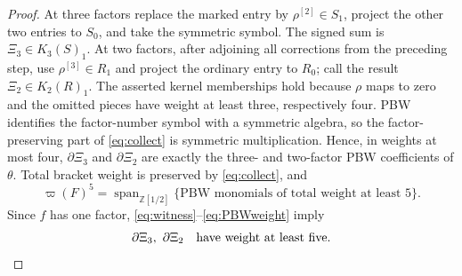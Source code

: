 \documentclass[10pt,a4paper]{amsart}
\theoremstyle{remark}
\newcommand{\R}{\mathbb Z[1/2]}
\newcommand{\aug}{\varpi}
\begin{document}
\begin{proof}
At three factors replace the marked entry by
$\rho^{[2]}\in S_1$, project the other two entries to $S_0$, and take
the symmetric symbol.  The signed sum is
$\Xi_3\in K_3(S)_1$.  At two factors, after adjoining all corrections
from the preceding step, use $\rho^{[3]}\in R_1$ and project the
ordinary entry to $R_0$; call the result
$\Xi_2\in K_2(R)_1$.  The asserted kernel memberships hold because
$\rho$ maps to zero and the omitted pieces have weight at least three,
respectively four.  PBW identifies the factor-number symbol with a
symmetric algebra, so the factor-preserving part of
\eqref{eq:collect} is symmetric multiplication.  Hence, in weights at
most four, $\partial\Xi_3$ and $\partial\Xi_2$ are exactly the three-
and two-factor PBW coefficients of $\theta$.
Total bracket weight is preserved by \eqref{eq:collect}, and
\begin{equation}
 \aug(F)^5=\operatorname{span}_{\R}
 \{\text{PBW monomials of total weight at least }5\}.   \label{eq:PBWweight}
\end{equation}
Since $f$ has one factor,
\eqref{eq:witness}--\eqref{eq:PBWweight} imply
\begin{equation}
       \partial\Xi_3,\ \partial\Xi_2
       \quad\hbox{have weight at least five}.           \label{eq:cycles}
\end{equation}


\end{proof}
\end{document}

